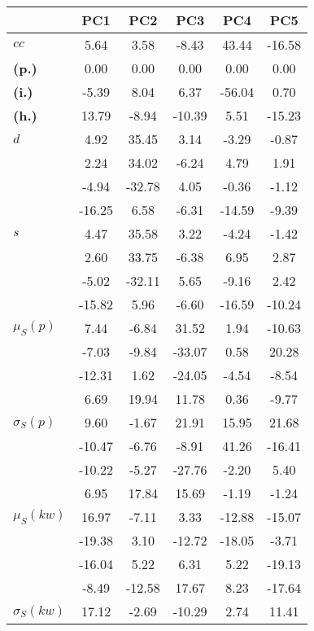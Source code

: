\begin{table}[h!]
\begin{center}
\begin{tabular}{| l || c | c | c | c | c |}\hline
 & {\bf PC1} & {\bf PC2} & {\bf PC3} & {\bf PC4} & {\bf PC5} \\\hline\hline
{\bf $cc$} & 5.64 & 3.58 & -8.43 & 43.44 & -16.58 \\
{\bf (p.)} & 0.00 & 0.00 & 0.00 & 0.00 & 0.00 \\
{\bf (i.)} & -5.39 & 8.04 & 6.37 & -56.04 & 0.70 \\
{\bf (h.)} & 13.79 & -8.94 & -10.39 & 5.51 & -15.23 \\\hline
{\bf $d$} & 4.92 & 35.45 & 3.14 & -3.29 & -0.87 \\
{\bf } & 2.24 & 34.02 & -6.24 & 4.79 & 1.91 \\
{\bf } & -4.94 & -32.78 & 4.05 & -0.36 & -1.12 \\
{\bf } & -16.25 & 6.58 & -6.31 & -14.59 & -9.39 \\\hline
{\bf $s$} & 4.47 & 35.58 & 3.22 & -4.24 & -1.42 \\
{\bf } & 2.60 & 33.75 & -6.38 & 6.95 & 2.87 \\
 & -5.02  & -32.11  & 5.65  & -9.16  & 2.42 \\
 & -15.82  & 5.96  & -6.60  & -16.59  & -10.24 \\\hline
$\mu_S(p)$ & 7.44  & -6.84  & 31.52  & 1.94  & -10.63 \\
 & -7.03  & -9.84  & -33.07  & 0.58  & 20.28 \\
 & -12.31  & 1.62  & -24.05  & -4.54  & -8.54 \\
 & 6.69  & 19.94  & 11.78  & 0.36  & -9.77 \\\hline
$\sigma_S(p)$ & 9.60  & -1.67  & 21.91  & 15.95  & 21.68 \\
 & -10.47  & -6.76  & -8.91  & 41.26  & -16.41 \\
 & -10.22  & -5.27  & -27.76  & -2.20  & 5.40 \\
 & 6.95  & 17.84  & 15.69  & -1.19  & -1.24 \\\hline
$\mu_S(kw)$ & 16.97  & -7.11  & 3.33  & -12.88  & -15.07 \\
 & -19.38  & 3.10  & -12.72  & -18.05  & -3.71 \\
 & -16.04  & 5.22  & 6.31  & 5.22  & -19.13 \\
 & -8.49  & -12.58  & 17.67  & 8.23  & -17.64 \\\hline
$\sigma_S(kw)$ & 17.12  & -2.69  & -10.29  & 2.74  & 11.41 \\

\end{tabular}
\end{center}
\end{table}
